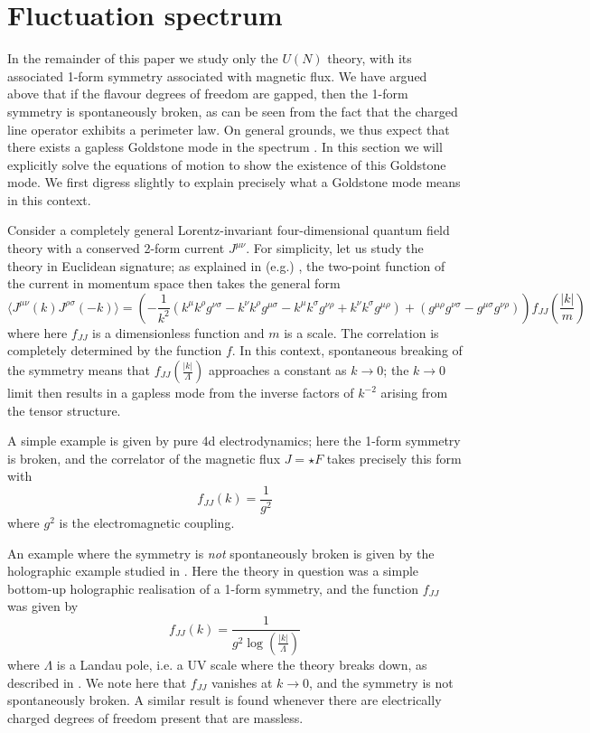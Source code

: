 \documentclass[aps,preprint,nofootinbib,preprintnumbers,eqsecnum,superscriptaddress]{revtex4}
\newcommand\sig{\sigma}
\newcommand\Lam{\Lambda}
\def\le{\left}
\def\ri{\right}
\begin{document}
\section{Fluctuation spectrum} \label{sec:flucspec} 

In the remainder of this paper we study only the $U(N)$ theory, with its associated 1-form symmetry associated with magnetic flux. We have argued above that if the flavour degrees of freedom are gapped, then the 1-form symmetry is spontaneously broken, as can be seen from the fact that the charged line operator exhibits a perimeter law. On general grounds, we thus expect that there exists a gapless Goldstone mode in the spectrum \cite{Hofman:2018lfz,Lake:2018dqm}. In this section we will explicitly solve the equations of motion to show the existence of this Goldstone mode. We first digress slightly to explain precisely what a Goldstone mode means in this context. 

Consider a completely general Lorentz-invariant four-dimensional quantum field theory with a conserved 2-form current $J^{\mu\nu}$. For simplicity, let us study the theory in Euclidean signature; as explained in (e.g.) \cite{Hofman:2017vwr}, the two-point function of the current in momentum space then takes the general form
\begin{equation}
	\langle J^{\mu\nu}(k) J^{\rho\sig}(-k)\rangle =  \le(-\frac{1}{k^2} \le(k^{\mu}k^{\rho} g^{\nu\sig} - k^{\nu}k^{\rho} g^{\mu\sig} - k^{\mu} k^{\sig} g^{\nu\rho} + k^{\nu} k^{\sig} g^{\mu\rho} \ri) + \le(g^{\mu\rho} g^{\nu\sig} - g^{\mu\sig} g^{\nu\rho}\ri)\ri) f_{JJ}\le(\frac{|k|}{m}\ri) \label{Jcorrdef}
\end{equation}
where here $f_{JJ}$ is a dimensionless function and $m$ is a scale. The correlation is completely determined by the function $f$. In this context, spontaneous breaking of the symmetry means that $f_{JJ}\left(\frac{|k|}{\Lam}\right)$ approaches a constant as $k \to 0$; the $k \to 0$ limit then results in a gapless mode from the inverse factors of $k^{-2}$ arising from the tensor structure. 

A simple example is given by pure 4d electrodynamics; here the 1-form symmetry is broken, and the correlator of the magnetic flux $J = \star F$ takes precisely this form with 
\begin{equation}
	f_{JJ}(k) = \frac{1}{g^2}
\end{equation}
where $g^2$ is the electromagnetic coupling. 

An example where the symmetry is {\it not} spontaneously broken is given by the holographic example studied in \cite{Hofman:2017vwr}. Here the theory in question was a simple bottom-up holographic realisation of a 1-form symmetry, and the function $f_{JJ}$ was given by
\begin{equation}
	f_{JJ}(k) = \frac{1}{g^2 \log\le(\frac{|k|}{\Lam}\ri)}
\end{equation}
where $\Lam$ is a Landau pole, i.e. a UV scale where the theory breaks down, as described in \cite{Hofman:2017vwr}. We note here that $f_{JJ}$ vanishes at $k \to 0$, and the symmetry is not spontaneously broken. A similar result is found whenever there are electrically charged degrees of freedom present that are massless. 
\end{document}
